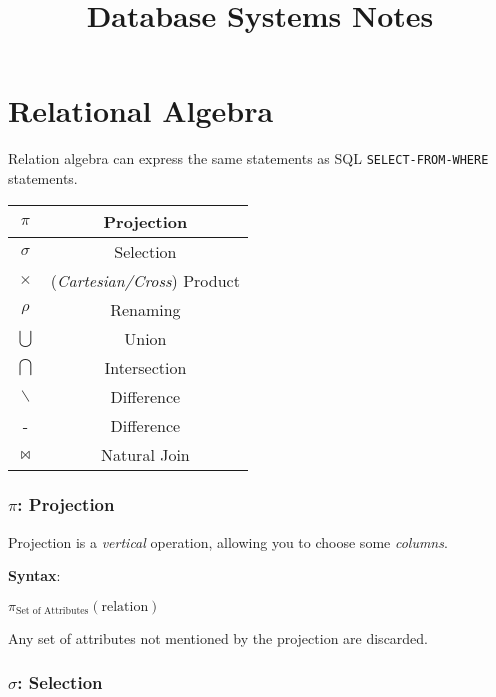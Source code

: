 \documentclass{article}
\begin{document}
\pagestyle{headings}

\title{Database Systems Notes}
\date{}
\maketitle

\section{Relational Algebra}

Relation algebra can express the same statements as SQL \texttt{SELECT-FROM-WHERE} statements.

\begin{center}
  \begin{tabular}{|c|c|}
    \hline
    $\pi$        & Projection                         \\
    \hline
    $\sigma$     & Selection                          \\
    \hline
    $\times$     & (\textit{Cartesian/Cross}) Product \\
    \hline
    $\rho$       & Renaming                           \\
    \hline
    $\bigcup$    & Union                              \\
    \hline
    $\bigcap$    & Intersection                       \\
    \hline
    $\backslash$ & Difference                         \\
    \hline
    -            & Difference                         \\
    \hline
    $\Join$      & Natural Join                       \\
    \hline
  \end{tabular}
\end{center}

\subsubsection*{$\pi$: Projection}

Projection is a \textit{vertical} operation, allowing you to choose some \textit{columns}.

\textbf{Syntax}:

$\pi_{\text{Set of Attributes}}(\text{relation})$

Any set of attributes not mentioned by the projection are discarded.

\subsubsection*{$\sigma$: Selection}
\end{document}
